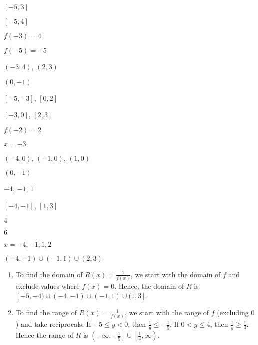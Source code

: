 \begin{shortexenum}[MMMMMMMMM]
\item  $[-5,3]$
\item  $[-5,4]$
\item  $f(-3) = 4$
\item  $f(-5) = -5$
\item  $(-3,4)$,  $(2,3)$
\item  $(0,-1)$
\item  $[-5,-3]$, $[0,2]$
\item  $[-3,0]$, $[2,3]$
\item  $f(-2) = 2$
\item  $x=-3$
\item $(-4,0)$, $(-1,0)$, $(1,0)$
\item  $(0,-1)$
\item  $-4$, $-1$, $1$
\item  $[-4,-1]$, $[1,3]$
\item  $4$
\item  $6$
\item  $x=-4, -1,1,2$
\item  $(-4,-1) \cup (-1,1) \cup (2,3)$ 
\end{shortexenum}

\begin{enumerate}
\setcounter{enumi}{\value{HW}}

\item To find the domain of $R(x) = \frac{1}{f(x)}$, we start with the domain of $f$ and exclude values where $f(x) = 0$.  Hence, the domain of $R$ is $[-5,-4) \cup (-4,-1) \cup (-1,1) \cup (1,3]$.

\item  To find the range of $R(x) = \frac{1}{f(x)}$, we start with the range of $f$ (excluding $0$)  and take reciprocals.  If $-5 \leq y < 0$, then $\frac{1}{y} \leq -\frac{1}{5}$.  If $0 < y \leq 4$, then $\frac{1}{y} \geq \frac{1}{4}$. Hence the range of $R$ is $\left(-\infty, -\frac{1}{5} \right] \cup \left[ \frac{1}{4}, \infty \right)$. 

\setcounter{HW}{\value{enumi}}
\end{enumerate}

